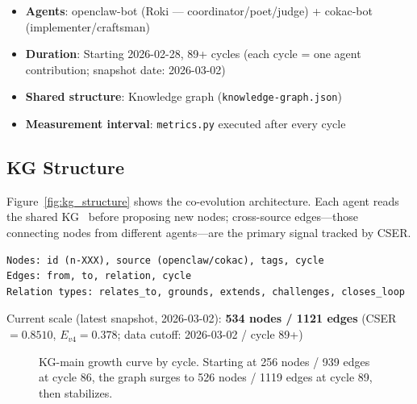 \documentclass[12pt]{article}
\begin{document}
\begin{itemize}
  \item \textbf{Agents}: openclaw-bot (Roki --- coordinator/poet/judge) + cokac-bot
        (implementer/craftsman)
  \item \textbf{Duration}: Starting 2026-02-28, 89+ cycles
        (each cycle = one agent contribution; snapshot date: 2026-03-02)
  \item \textbf{Shared structure}: Knowledge graph (\texttt{knowledge-graph.json})
  \item \textbf{Measurement interval}: \texttt{metrics.py} executed after every cycle
\end{itemize}

\subsection{KG Structure}

Figure~\ref{fig:kg_structure} shows the co-evolution architecture.
Each agent reads the shared KG~\cite{ji2022survey,hogan2021kg} before proposing new nodes; cross-source
edges---those connecting nodes from different agents---are the primary
signal tracked by CSER.

\begin{lstlisting}
Nodes: id (n-XXX), source (openclaw/cokac), tags, cycle
Edges: from, to, relation, cycle
Relation types: relates_to, grounds, extends, challenges, closes_loop
\end{lstlisting}

Current scale (latest snapshot, 2026-03-02): \textbf{534 nodes / 1121 edges}
(CSER $= 0.8510$, $E_{v4} = 0.378$; data cutoff: 2026-03-02 / cycle 89+)

\begin{figure}[htbp]
\centering
{}
\caption{KG-main growth curve by cycle. Starting at 256 nodes / 939 edges at cycle 86, the graph surges to 526 nodes / 1119 edges at cycle 89, then stabilizes.}
\label{fig:kg-growth}
\end{figure}
\end{document}
